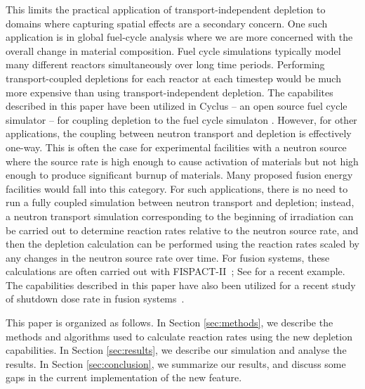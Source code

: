     This limits the practical application of transport-independent depletion to
    domains where capturing spatial effects are a secondary concern. One
    such application is in global fuel-cycle analysis where we are more
    concerned with the overall change in material composition. Fuel cycle
    simulations typically model many different reactors simultaneously over
    long time periods. Performing transport-coupled depletions for each reactor
    at each timestep would be much more expensive than using
    transport-independent depletion. The capabilites described in this paper
    have been utilized in Cyclus \cite{huff_fundamental_2016} -- an open source
    fuel cycle simulator -- for coupling depletion to the fuel cycle
    simulaton \cite{bachmann_os_2024}. However, for other applications, the
    coupling between neutron transport and depletion is effectively one-way.
    This is often the case for experimental facilities with a neutron source
    where the source rate is high enough to cause activation of materials but
    not high enough to produce significant burnup of materials. Many proposed fusion
    energy facilities would fall into this category.  For such applications, there is
    no need to run a fully coupled simulation between neutron transport and
    depletion; instead, a neutron transport simulation corresponding to the
    beginning of irradiation can be carried out to determine reaction rates
    relative to the neutron source rate, and then the depletion calculation can
    be performed using the reaction rates scaled by any changes in the neutron
    source rate over time. For fusion systems, these calculations are often
    carried out with FISPACT-II~\citep{sublet2017nds}; See \citet{eade2020nf}
    for a recent example. The capabilities described in this paper have also
    been utilized for a recent study of shutdown dose rate in fusion
    systems~\citep{peterson2024nf}.

    This paper is organized as follows. In Section \ref{sec:methods}, we describe
    the methods and algorithms used to calculate reaction rates using the new
    depletion capabilities. In Section \ref{sec:results}, we describe our
    simulation and analyse the results. In Section \ref{sec:conclusion}, we
    summarize our results, and discuss some gaps in the current implementation
    of the new feature.


